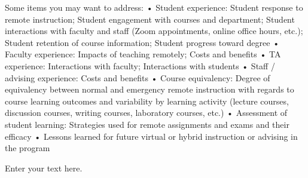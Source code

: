 \documentclass[12pt]{article}
\begin{document}
Some items you may want to address:
    • Student experience: Student response to remote instruction; Student engagement with courses and department; Student interactions with faculty and staff (Zoom appointments, online office hours, etc.); Student retention of course information; Student progress toward degree
    • Faculty experience: Impacts of teaching remotely; Costs and benefits
    • TA experience: Interactions with faculty; Interactions with students
    • Staff / advising experience: Costs and benefits
    • Course equivalency: Degree of equivalency between normal and emergency remote instruction with regards to course learning outcomes and variability by learning activity (lecture courses, discussion courses, writing courses, laboratory courses, etc.)
    • Assessment of student learning: Strategies used for remote assignments and exams and their efficacy
    • Lessons learned for future virtual or hybrid instruction or advising in the program

Enter your text here.
\end{document}
